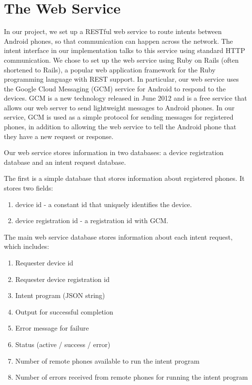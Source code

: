 \documentclass{acm_proc_article-sp}
\begin{document}
\section{The Web Service}
\label{section:webservice}

In our project, we set up a RESTful web service to route intents
between Android phones, so that communication can happen across the
network.  The intent interface in our implementation talks to this
service using standard HTTP communication.  We chose to set up the web
service using Ruby on Rails (often shortened to Rails), a popular web
application framework for the Ruby programming language with REST
support.  In particular, our web service uses the Google Cloud
Messaging (GCM) service for Android to respond to the devices.  GCM is
a new technology released in June 2012 and is a free service that
allows our web server to send lightweight messages to Android phones.
In our service, GCM is used as a simple protocol for sending messages
for registered phones, in addition to allowing the web service to tell
the Android phone that they have a new request or response.

Our web service stores information in two databases: a device registration database and an intent request database.


The first is a simple database that stores information about registered phones.  It stores two fields: 

 \begin{enumerate}
 \item device id - a constant id that uniquely identifies the device.
 \item device registration id - a registration id with GCM.
 \end{enumerate}

The main web service database stores information about each intent request, which includes:

\begin{enumerate}
\item Requester device id
\item Requester device registration id
\item Intent program (JSON string)
\item Output for successful completion
\item Error message for failure
\item Status (active / success / error)
\item Number of remote phones available to run the intent program
\item Number of errors received from remote phones for running the intent program
\end{enumerate}
\end{document}
